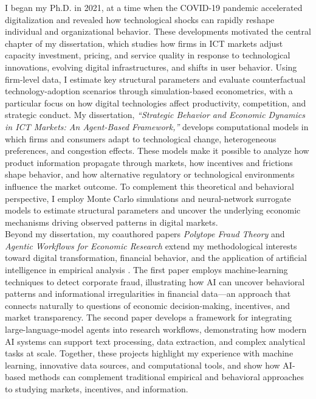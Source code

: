 \documentclass{nfr}
\begin{document}
I began my Ph.D. in 2021, at a time when the COVID-19 pandemic accelerated digitalization and revealed how technological shocks can rapidly reshape individual and organizational behavior. 
These developments motivated the central chapter of my dissertation, which studies how firms in ICT markets adjust capacity investment, pricing, and service quality in response to technological innovations, evolving digital infrastructures, and shifts in user behavior. 
Using firm-level data, I estimate key structural parameters and evaluate counterfactual technology-adoption scenarios through simulation-based econometrics, with a particular focus on how digital technologies affect productivity, competition, and strategic conduct.
My dissertation, \textit{“Strategic Behavior and Economic Dynamics in ICT Markets: An Agent-Based Framework,”} develops computational models in which firms and consumers adapt to technological change, heterogeneous preferences, and congestion effects. 
These models make it possible to analyze how product information propagate through markets, how incentives and frictions shape behavior, and how alternative regulatory or technological environments influence the market outcome. 
To complement this theoretical and behavioral perspective, I employ Monte Carlo simulations and neural-network surrogate models to estimate structural parameters and uncover the underlying economic mechanisms driving observed patterns in digital markets.\\

Beyond my dissertation, my coauthored papers \textit{Polytope Fraud Theory} and \textit{Agentic Workflows for Economic Research} extend my methodological interests toward digital transformation, financial behavior, and the application of artificial intelligence in empirical analysis \citep{Zhao2025, Dawid2025}. 
The first paper employs machine-learning techniques to detect corporate fraud, illustrating how AI can uncover behavioral patterns and informational irregularities in financial data—an approach that connects naturally to questions of economic decision-making, incentives, and market transparency. 
The second paper develops a framework for integrating large-language-model agents into research workflows, demonstrating how modern AI systems can support text processing, data extraction, and complex analytical tasks at scale. 
Together, these projects highlight my experience with machine learning, innovative data sources, and computational tools, and show how AI-based methods can complement traditional empirical and behavioral approaches to studying markets, incentives, and information.\\
\end{document}
